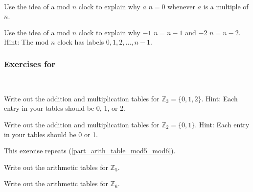 \begin{exer}[\exerE] %
~
    \begin{exerpart}
        \item Use the idea of a mod $n$ clock to explain why $a$  $n=0$ whenever $a$ is a multiple of $n$.
        \item Use the idea of a mod $n$ clock to explain why $-1$  $n=n-1$ and $-2$  $n=n-2$.  Hint: The mod $n$ clock has labels $0,1,2,\ldots,n-1$.
    \end{exerpart}
\end{exer}


\subsubsection*{Exercises for 
\subzn}

\begin{exer}[\exerP] %
\label{exer_arith_tables_mod2_mod3}
~
    \begin{exerpart}
        \item Write out the addition and multiplication tables for $\mathbb{Z}_3=\{0,1,2\}$.  Hint: Each entry in your tables should be 0, 1, or 2.
        \item Write out the addition and multiplication tables for $\mathbb{Z}_2=\{0,1\}$.  Hint: Each entry in your tables should be 0 or 1.
    \end{exerpart}
\end{exer}

\begin{exer}[\exerP] %
\label{exer_arith_table_mod5_mod6_again}
    This exercise repeats  (\ref{part_arith_table_mod5_mod6}).
        \begin{exerpart}
            \item Write out the arithmetic tables for $\mathbb{Z}_5$.
            \item Write out the arithmetic tables for $\mathbb{Z}_6$.  
    \end{exerpart}
\end{exer}

